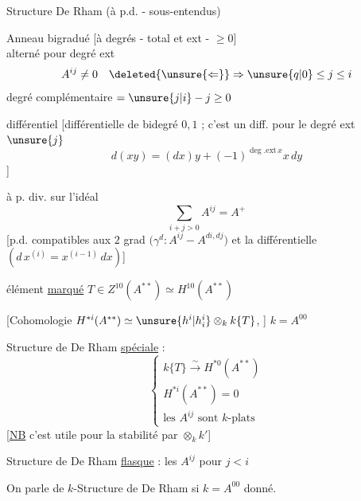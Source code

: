 

Structure De Rham (à p.d. - sous-entendus)

Anneau bigradué [à degrés - total et ext - $\geq0$]\\
alterné pour degré ext
\[
A^{ij}\neq0\quad\deleted{\unsure{\Leftarrow}}\Rightarrow\unsure{q|0}\leq j\leq i
\]
degré complémentaire $=\unsure{j|i}-j\geq0$

différentiel [différentielle de bidegré $0,1$ ; c'est un diff. pour le degré ext $\unsure{j}$
\[
d(xy)=(dx)y+(-1)^{\deg.\mathrm{ext}\,x}x\,dy
\]
]

à p. div. sur l'idéal
\[
\sum_{i+j>0}A^{ij}=A^+
\]
[p.d.  compatibles aux $2$ grad
$\bigl(\gamma^d:A^{ij}\mathbin{-}A^{di,dj}\bigr)$
et la différentielle $(d\,x^{(i)}=x^{(i-1)}\,dx)$]

élément \uline{marqué}
$T\in Z^{10}(A^{**})\simeq H^{10}(A^{**})$

[Cohomologie $H^{*i}(A^{**})\simeq\unsure{h^i|h_i^i}\otimes_k k\{T\}$, ] $k=A^{00}$

Structure de De Rham \uline{spéciale} :
\[
\left\{\begin{array}{l}
k\{T\}\overset{\sim}{\longrightarrow}H^{*0}(A^{**})\\
H^{*i}(A^{**})=0\\
\text{les }A^{ij}\text{ sont }k\text{-plats}
\end{array}\right.
\]
[\uline{NB} c'est utile pour la stabilité par $\otimes_k k'$]

Structure de De Rham \uline{flasque} : les $A^{ij}$ pour $j<i$


On parle de $k$-Structure de De Rham si $k=A^{00}$  donné.

